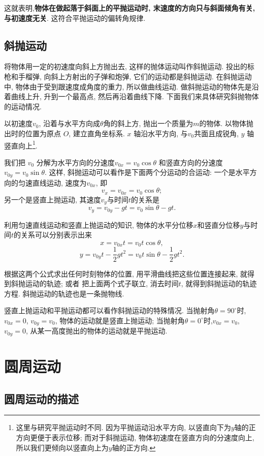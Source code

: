 \documentclass[11pt,a4paper]{ctexbook}
\begin{document}
这就表明,\textbf{物体在做起落于斜面上的平抛运动时, 末速度的方向只与斜面倾角有关, 与初速度无关}.
这符合平抛运动的偏转角规律.

\section{斜抛运动}


将物体用一定的初速度向斜上方抛出去, 这样的抛体运动叫作斜抛运动.
投出的标枪和手榴弹, 向斜上方射出的子弹和炮弹, 它们的运动都是斜抛运动.
在斜抛运动中, 物体由于受到跟速度成角度的重力, 所以做曲线运动.
做斜抛运动的物体先是沿着曲线上升, 升到一个最高点, 然后再沿着曲线下降.
下面我们来具体研究斜抛物体的运动情况.

以初速度$v_0$, 沿着与水平方向成$\theta$角的斜上方, 抛出一个质量为$m$的物体.
以物体抛出时的位置为原点 $O$, 建立直角坐标系. $x$ 轴沿水平方向, 与$v_0$共面且成锐角, $y$ 轴竖直向上\footnote{这里与研究平抛运动时不同. 因为平抛运动沿水平方向, 以竖直向下为$y$轴的正方向更便于表示位移; 而对于斜抛运动, 物体初速度在竖直方向的分速度向上, 所以我们更倾向以竖直向上为$y$轴的正方向.}.

我们把 $v_0$ 分解为水平方向的分速度$v_{0x} = v_0\cos\theta$
和竖直方向的分速度$v_{0y} = v_0\sin\theta.$ 这样, 斜抛运动可以看作是下面两个分运动的合运动:
一个是水平方向的匀速直线运动, 速度为$v_{0x}$, 即$$v_x = v_{0x} = v_0\cos\theta;$$ 另一个是竖直上抛运动, 其速度$v_y$与时间$t$的关系是
$$v_y = v_{0y}-gt = v_0\sin\theta - gt.$$

利用匀速直线运动和竖直上抛运动的知识, 物体的水平分位移$x$和竖直分位移$y$与时间$t$的关系可以分别表示出来
$$x = v_{0x}t = v_0t\cos\theta,$$
$$y = v_{0y}t-\frac12 gt^2 = v_{0}t\sin\theta-\frac12 gt^2.$$

根据这两个公式求出任何时刻物体的位置, 用平滑曲线把这些位置连接起来, 就得到斜抛运动的轨迹; 或者
把上面两个式子联立, 消去时间$t$, 就得到斜抛运动的轨迹方程. 斜抛运动的轨迹也是一条抛物线.

竖直上抛运动和平抛运动都可以看作斜抛运动的特殊情况. 当抛射角$\theta = 90^{\circ}$时, $v_{0x}=0$,
$v_{0y}=v_0$, 物体的运动就是竖直上抛运动; 当抛射角$\theta = 0^{\circ}$时,$v_{0x}=v_0$,
$v_{0y}=0$, 从某一高度抛出的物体的运动就是平抛运动.


\chapter{圆周运动}
\section{圆周运动的描述}
\end{document}
